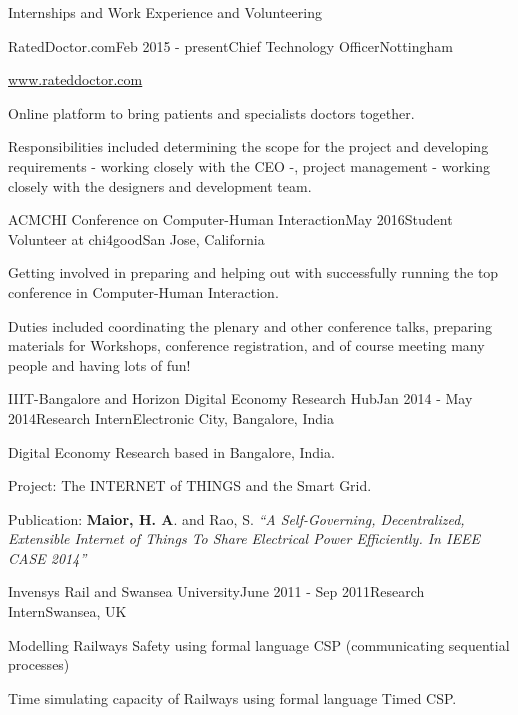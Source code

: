 \documentclass{resume} %
\begin{document}
\begin{rSection}{Internships and Work Experience and Volunteering}
    \begin{rSubsection}{RatedDoctor.com}{Feb 2015 - present}{Chief Technology Officer}{Nottingham}
        \item \url{www.rateddoctor.com}
        \item Online platform to bring patients and specialists doctors together.
        \item Responsibilities included determining the scope for the project and developing requirements - working closely with the CEO -, project management - working closely with the designers and development team.
    \end{rSubsection}

	\begin{rSubsection}{ACMCHI Conference on  Computer-Human Interaction}{May 2016}{Student Volunteer at chi4good}{San Jose, California}
        \item Getting involved in preparing and helping out with successfully running the top conference in Computer-Human Interaction. 
        \item Duties included coordinating the plenary and other conference talks, preparing materials for Workshops, conference registration, and of course meeting many people and having lots of fun!
    \end{rSubsection}

	\begin{rSubsection}{IIIT-Bangalore and Horizon Digital Economy Research Hub}{Jan 2014 - May 2014}{Research Intern}{Electronic City, Bangalore, India}
		\item Digital Economy Research based in Bangalore, India.
		\item Project: The INTERNET of THINGS and the Smart Grid.
		\item Publication: \textbf{Maior, H. A}. and Rao, S.  \emph{``A Self-Governing, Decentralized, Extensible Internet of Things To Share Electrical Power Efficiently. In IEEE CASE 2014''}
	\end{rSubsection}
	\begin{rSubsection}{Invensys Rail and Swansea University}{June 2011 - Sep 2011}{Research Intern}{Swansea, UK}
		\item Modelling Railways Safety using formal language CSP (communicating sequential processes)
		\item Time simulating capacity of Railways using formal language Timed CSP.
	\end{rSubsection}


\end{rSection}
\end{document}
